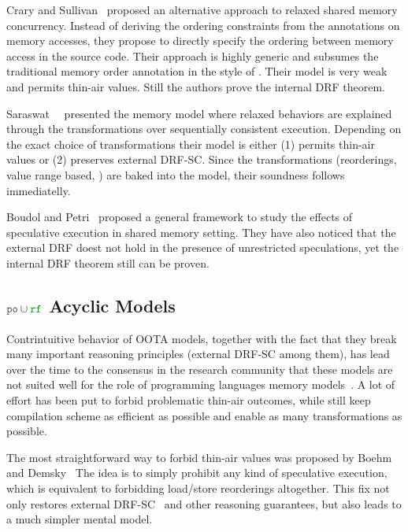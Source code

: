 Crary and Sullivan~\cite{Crary-Sullivan:POPL15} proposed 
an alternative approach to relaxed shared memory concurrency.
Instead of deriving the ordering constraints from the annotations 
on memory accesses, they propose to directly specify 
the ordering between memory access in the source code. 
Their approach is highly generic and subsumes 
the traditional memory order annotation in the style of \CMM.
Their model is very weak and permits thin-air values. 
Still the authors prove the internal DRF theorem.

Saraswat~\etal~\cite{Saraswat-al:PPoPP07} presented the \RAO memory model
where relaxed behaviors are explained through the transformations 
over sequentially consistent execution.
Depending on the exact choice of transformations 
their model is either (1) permits thin-air values or 
(2) preserves external DRF-SC. 
Since the transformations (\eg reorderings, value range based, \etc)
are baked into the model, their soundness follows immediatelly.  

Boudol and Petri~\cite{Boudol-Petri:ESOP10} proposed a general 
framework to study the effects of speculative execution in
shared memory setting. 
They have also noticed that the external DRF doest not 
hold in the presence of unrestricted speculations, 
yet the internal DRF theorem still can be proven. 

\subsection{$\lPO\cup\lRF$ Acyclic Models}
\label{sec:porf-acyc}

Contrintuitive behavior of OOTA models, together with the fact that they break 
many important reasoning principles (external DRF-SC among them), 
has lead over the time to the consensus in the research community that these models 
are not suited well for the role of 
programming languages memory models~\cite{Boehm-Demsky:MSPC14, Batty-al:ESOP15}.
A lot of effort has been put to forbid problematic 
thin-air outcomes, while still keep compilation scheme as efficient as possible
and enable as many transformations as possible.

The most straightforward way to forbid thin-air values 
was proposed by Boehm and Demsky~\cite{Boehm-Demsky:MSPC14}
The idea is to simply prohibit any kind of speculative execution, 
which is equivalent to forbidding load/store reorderings altogether. 
This fix not only restores external DRF-SC~\cite{Lahav-al:PLDI17}
and other reasoning guarantees, but also leads to 
a much simpler mental model.  

